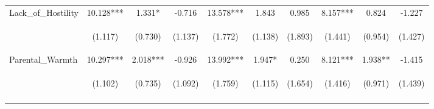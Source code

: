 \begin{tabular}{lccccccccc}
\noalign{\smallskip}Lack_of_Hostility & 10.128*** & 1.331* & -0.716 & 13.578*** & 1.843 & 0.985 & 8.157*** & 0.824 & -1.227\\
 & \begin{footnotesize}(1.117)\end{footnotesize} & \begin{footnotesize}(0.730)\end{footnotesize} & \begin{footnotesize}(1.137)\end{footnotesize} & \begin{footnotesize}(1.772)\end{footnotesize} & \begin{footnotesize}(1.138)\end{footnotesize} & \begin{footnotesize}(1.893)\end{footnotesize} & \begin{footnotesize}(1.441)\end{footnotesize} & \begin{footnotesize}(0.954)\end{footnotesize} & \begin{footnotesize}(1.427)\end{footnotesize}\\
\noalign{\smallskip}Parental_Warmth & 10.297*** & 2.018*** & -0.926 & 13.992*** & 1.947* & 0.250 & 8.121*** & 1.938** & -1.415\\
 & \begin{footnotesize}(1.102)\end{footnotesize} & \begin{footnotesize}(0.735)\end{footnotesize} & \begin{footnotesize}(1.092)\end{footnotesize} & \begin{footnotesize}(1.759)\end{footnotesize} & \begin{footnotesize}(1.115)\end{footnotesize} & \begin{footnotesize}(1.654)\end{footnotesize} & \begin{footnotesize}(1.416)\end{footnotesize} & \begin{footnotesize}(0.971)\end{footnotesize} & \begin{footnotesize}(1.439)\end{footnotesize}\\
\noalign{\smallskip}\hline\end{tabular}\\
